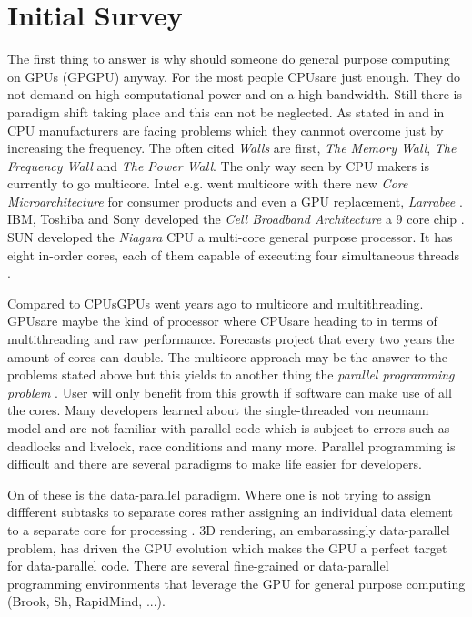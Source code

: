 \section*{Initial Survey} 
\label{sub:initial_survey} 
The first thing to answer is why should someone do general purpose computing on
GPUs (GPGPU) anyway. For the most people \glspl{CPU}are just enough. They do not
demand on high computational power and on a high bandwidth. Still there is
paradigm shift taking place and this can not be neglected. As stated in
\citep{citeulike:1187394} and in \citep{citeulike:3421647} CPU manufacturers are
facing problems which they cannnot overcome just by increasing the frequency.
The often cited \emph{Walls} are first, \emph{The Memory
Wall}\citep{citeulike:457955}, \emph{The Frequency Wall} and \emph{The Power
Wall}. The only way seen by CPU makers is currently to go multicore. Intel e.g.
went multicore with there new \emph{Core Microarchitecture} for consumer
products and even a \gls{GPU} replacement, \emph{Larrabee} \citep{citeulike:3153758}.
IBM, Toshiba and Sony developed the \emph{Cell Broadband Architecture} a 9 core
chip \citep{citeulike:1243173}. SUN developed the \emph{Niagara} CPU a multi-core
general purpose processor. It has eight in-order cores, each of them capable of
executing four simultaneous threads \citep{citeulike:3743958}.

Compared to \glspl{CPU}GPUs went years ago to multicore and multithreading. \glspl{GPU}are
maybe the kind of processor where \glspl{CPU}are heading to in terms of multithreading
and raw performance. Forecasts project that every two years the amount of cores
can double. The multicore approach may be the answer to the problems stated
above but this yields to another thing the \emph{parallel programming problem}
\citep{citeulike:3750573}. User will only benefit from this growth if software
can make use of all the cores. Many developers learned about the
single-threaded von neumann model and are not familiar with parallel code which
is subject to errors such as deadlocks and livelock, race conditions and many
more. Parallel programming is difficult and there are several paradigms to make
life easier for developers. 

On of these is the data-parallel paradigm. Where one
is not trying to assign diffferent subtasks to separate cores rather assigning
an individual data element to a separate core for processing
\citep{citeulike:3750565}. 3D rendering, an embarassingly data-parallel problem,
has driven the \gls{GPU} evolution which makes the \gls{GPU} a perfect target for
data-parallel code. There are several fine-grained or data-parallel programming
environments that leverage the \gls{GPU} for general purpose computing (Brook, Sh,
RapidMind, ...). 

